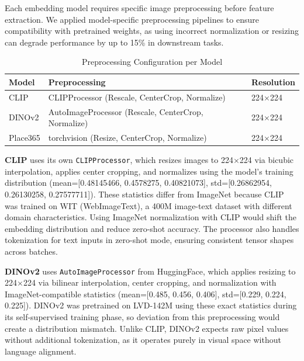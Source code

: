 \documentclass[conference]{IEEEtran}
\begin{document}
Each embedding model requires specific image preprocessing before feature extraction. We applied model-specific preprocessing pipelines to ensure compatibility with pretrained weights, as using incorrect normalization or resizing can degrade performance by up to 15\% in downstream tasks.

\begin{table}[htbp]
\caption{Preprocessing Configuration per Model}
\begin{center}
\small
\begin{tabular}{@{}lll@{}}
\toprule
\textbf{Model} & \textbf{Preprocessing} & \textbf{Resolution} \\
\midrule
CLIP & CLIPProcessor (Rescale, CenterCrop, Normalize) & 224$\times$224 \\
DINOv2 & AutoImageProcessor (Rescale, CenterCrop, Normalize) & 224$\times$224 \\
Place365 & torchvision (Resize, CenterCrop, Normalize) & 224$\times$224 \\
\bottomrule
\end{tabular}
\label{tab:preprocessing}
\end{center}
\end{table}

\textbf{CLIP} uses its own \texttt{CLIPProcessor}, which resizes images to 224$\times$224 via bicubic interpolation, applies center cropping, and normalizes using the model's training distribution (mean=[0.48145466, 0.4578275, 0.40821073], std=[0.26862954, 0.26130258, 0.27577711]). These statistics differ from ImageNet because CLIP was trained on WIT (WebImageText), a 400M image-text dataset with different domain characteristics. Using ImageNet normalization with CLIP would shift the embedding distribution and reduce zero-shot accuracy. The processor also handles tokenization for text inputs in zero-shot mode, ensuring consistent tensor shapes across batches.

\textbf{DINOv2} uses \texttt{AutoImageProcessor} from HuggingFace, which applies resizing to 224$\times$224 via bilinear interpolation, center cropping, and normalization with ImageNet-compatible statistics (mean=[0.485, 0.456, 0.406], std=[0.229, 0.224, 0.225]). DINOv2 was pretrained on LVD-142M using these exact statistics during its self-supervised training phase, so deviation from this preprocessing would create a distribution mismatch. Unlike CLIP, DINOv2 expects raw pixel values without additional tokenization, as it operates purely in visual space without language alignment.
\end{document}
